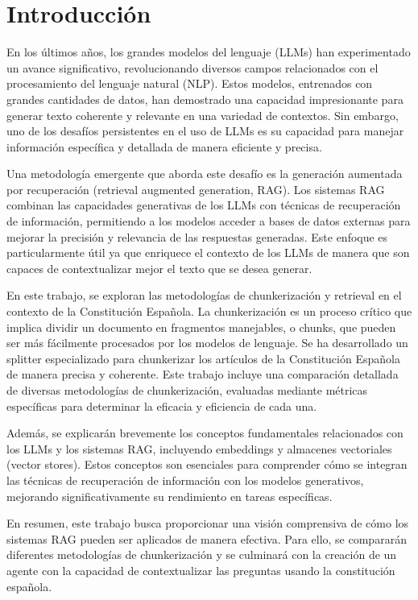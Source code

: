 
\cleardoublepage

\chapter{Introducción}
\label{introduccion}

En los últimos años, los grandes modelos del lenguaje (LLMs) han experimentado un avance significativo, revolucionando diversos campos relacionados con el procesamiento del lenguaje natural (NLP). Estos modelos, entrenados con grandes cantidades de datos, han demostrado una capacidad impresionante para generar texto coherente y relevante en una variedad de contextos. Sin embargo, uno de los desafíos persistentes en el uso de LLMs es su capacidad para manejar información específica y detallada de manera eficiente y precisa.

Una metodología emergente que aborda este desafío es la generación aumentada por recuperación (retrieval augmented generation, RAG). Los sistemas RAG combinan las capacidades generativas de los LLMs con técnicas de recuperación de información, permitiendo a los modelos acceder a bases de datos externas para mejorar la precisión y relevancia de las respuestas generadas. Este enfoque es particularmente útil ya que enriquece el contexto de los LLMs de manera que son capaces de contextualizar mejor el texto que se desea generar.

En este trabajo, se exploran las metodologías de chunkerización y retrieval en el contexto de la Constitución Española. La chunkerización es un proceso crítico que implica dividir un documento en fragmentos manejables, o chunks, que pueden ser más fácilmente procesados por los modelos de lenguaje. Se ha desarrollado un splitter especializado para chunkerizar los artículos de la Constitución Española de manera precisa y coherente. Este trabajo incluye una comparación detallada de diversas metodologías de chunkerización, evaluadas mediante métricas específicas para determinar la eficacia y eficiencia de cada una.

Además, se explicarán brevemente los conceptos fundamentales relacionados con los LLMs y los sistemas RAG, incluyendo embeddings y almacenes vectoriales (vector stores). Estos conceptos son esenciales para comprender cómo se integran las técnicas de recuperación de información con los modelos generativos, mejorando significativamente su rendimiento en tareas específicas.

En resumen, este trabajo busca proporcionar una visión comprensiva de cómo los sistemas RAG pueden ser aplicados de manera efectiva. Para ello, se compararán diferentes metodologías de chunkerización y se culminará con la creación de un agente con la capacidad de contextualizar las preguntas usando la constitución española.
